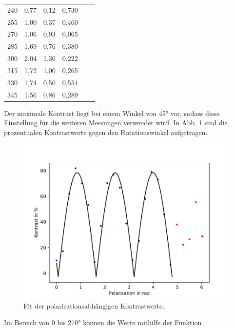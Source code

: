 \begin{table}
\begin{tabular}{c c c c c c}
                    240 & 0,77 & 0,12 & 0,730 \\
                    255 & 1,00 & 0,37 & 0,460 \\
                    270 & 1,06 & 0,93 & 0,065 \\
                    285 & 1,69 & 0,76 & 0,380 \\
                    300 & 2,04 & 1,30  & 0,222 \\
                    315 & 1,72 & 1,00    & 0,265 \\
                    330 & 1,74 & 0,50  & 0,554 \\
                    345 & 1,56 & 0,86 & 0,289 \\
                    \bottomrule
                \end{tabular}
            \end{table}

            Der maximale Kontrast liegt bei einem Winkel von 45° vor, sodass diese Einstellung für die 
            weiteren Messungen verwendet wird. 
            In Abb. \ref{fig:kontrast} sind die prozentualen Kontrastwerte gegen den Rotationswinkel aufgetragen.

            \begin{figure}
                \centering 
                \includegraphics{kontrast.pdf}
                \caption{Fit der polarisationsabhängigen Kontrastwerte.}
                \label{fig:kontrast}
            \end{figure}

            Im Bereich von 0 bis 270° können die Werte mithilfe der Funktion 


